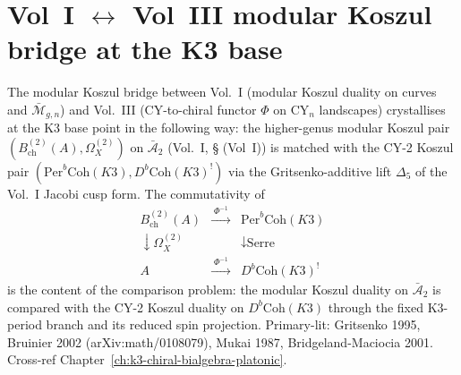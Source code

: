 \section{Vol~I \texorpdfstring{$\leftrightarrow$}{<->} Vol~III modular Koszul bridge at the K3 base}
\label{sec:mkbridge-supplement}

\begin{remark}
\label{rem:mkbridge-1}
The modular Koszul bridge between Vol.~I (modular Koszul duality on
curves and $\bar{\mathcal M}_{g,n}$) and Vol.~III (CY-to-chiral functor
$\Phi$ on CY$_n$ landscapes) crystallises at the K3 base point
in the following way: the higher-genus modular Koszul pair
$(B^{(2)}_{\mathrm{ch}}(A), \Omega^{(2)}_X)$ on $\bar{\mathcal A}_2$
(Vol.~I, \S\cite{VolI} (Vol~I)) is matched with the CY-2
Koszul pair $(\mathrm{Per}^b\mathrm{Coh}(K3), D^b\mathrm{Coh}(K3)^!)$
via the Gritsenko-additive lift $\Delta_5$ of the Vol.~I Jacobi cusp
form. The commutativity of
\[
\begin{array}{ccc}
B^{(2)}_{\mathrm{ch}}(A) & \xrightarrow{\;\Phi^{-1}\;} & \mathrm{Per}^b\mathrm{Coh}(K3) \\
\downarrow{\scriptstyle\Omega^{(2)}_X} & & \downarrow{\scriptstyle\text{Serre}} \\
A & \xrightarrow{\;\Phi^{-1}\;} & D^b\mathrm{Coh}(K3)^!
\end{array}
\]
is the content of the comparison problem: the modular Koszul duality on
$\bar{\mathcal A}_2$ is compared with the CY-2 Koszul duality on
$D^b\mathrm{Coh}(K3)$ through the fixed K3-period branch and its
reduced spin projection.
Primary-lit: Gritsenko 1995, Bruinier 2002 (arXiv:math/0108079),
Mukai 1987, Bridgeland-Maciocia 2001. Cross-ref
Chapter~\ref{ch:k3-chiral-bialgebra-platonic}.
\end{remark}

